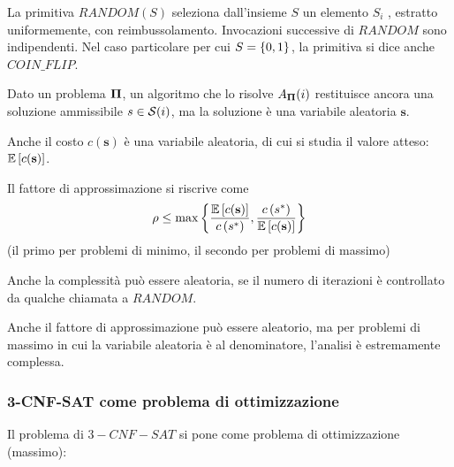 \begin{definition}
    La primitiva $RANDOM(S)$ seleziona
    dall'insieme $S$
    un elemento $S_i$
    , estratto uniformemente, con reimbussolamento.
    Invocazioni successive di $RANDOM$ sono indipendenti.
    Nel caso particolare per cui $S = \left\{0,1\right\}^{}$, la primitiva si dice anche $COIN\_FLIP$.
    \label{def:random}
\end{definition}

Dato un problema $\bm{\Pi}$, un algoritmo che lo risolve $
A_{\bm{\Pi}} (i)
$ restituisce ancora una soluzione ammissibile $
s \in \mathcal{S}(i)
$, ma la soluzione è una variabile aleatoria $
\mathbf{s}
$.

Anche il costo $
c(
\mathbf{s}
)
$ è una variabile aleatoria, di cui si studia il valore atteso: $
\mathbb{E}\left[ c( \mathbf{s}) \right]
$.

Il fattore di approssimazione si riscrive come
\begin{equation*}
    \rho
    \leq
    \max 
    \left\{ 
        \frac{
            \mathbb{E}\left[ c( \mathbf{s}) \right]
        }{
            c \left( 
                s^*
            \right)
        }
        ,
        \frac{
            c \left( 
                s^*
            \right)
        }{
            \mathbb{E}\left[ c( \mathbf{s}) \right]
        }
    \right\}
\end{equation*}
(il primo per problemi di minimo, il secondo per problemi di massimo)

Anche la complessità può essere aleatoria, se il numero di iterazioni è controllato da qualche chiamata a $RANDOM$.

Anche il fattore di approssimazione può essere aleatorio, ma per problemi di massimo in cui la variabile aleatoria è al denominatore, l'analisi è estremamente complessa.

\subsubsection{3-CNF-SAT come problema di ottimizzazione}

Il problema di $3-CNF-SAT$ si pone come problema di ottimizzazione (massimo):

